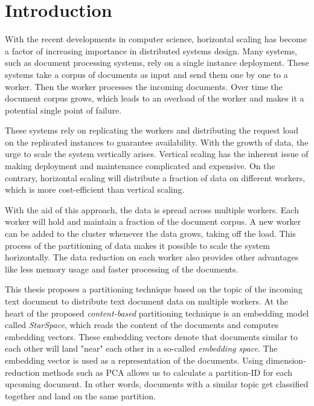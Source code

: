 \chapter{Introduction}

With the recent developments in computer science, horizontal scaling has become a factor of increasing importance in distributed systems design. Many systems, such as document processing systems, rely on a single instance deployment. These systems take a corpus of documents as input and send them one by one to a worker. Then the worker processes the incoming documents. Over time the document corpus grows, which leads to an overload of the worker and makes it a potential single point of failure.


These systems rely on replicating the workers and distributing the request load on the replicated instances to guarantee availability. With the growth of data, the urge to scale the system vertically arises. Vertical scaling has the inherent issue of making deployment and maintenance complicated and expensive. On the contrary, horizontal scaling will distribute a fraction of data on different workers, which is more cost-efficient than vertical scaling. 


With the aid of this approach, the data is spread across multiple workers. Each worker will hold and maintain a fraction of the document corpus. A new worker can be added to the cluster whenever the data grows, taking off the load. This process of the partitioning of data makes it possible to scale the system horizontally. The data reduction on each worker also provides other advantages like less memory usage and faster processing of the documents.


This thesis proposes a partitioning technique based on the topic of the incoming text document to distribute text document data on multiple workers. 
At the heart of the proposed \emph{content-based} partitioning technique is an embedding model called \emph{StarSpace}, which reads the content of the documents and computes embedding vectors. These embedding vectors denote that documents similar to each other will land "near" each other in a so-called \emph{embedding space}. The embedding vector is used as a representation of the documents. Using dimension-reduction methods such as PCA allows us to calculate a partition-ID for each upcoming document. In other words, documents with a similar topic get classified together and land on the same partition.



